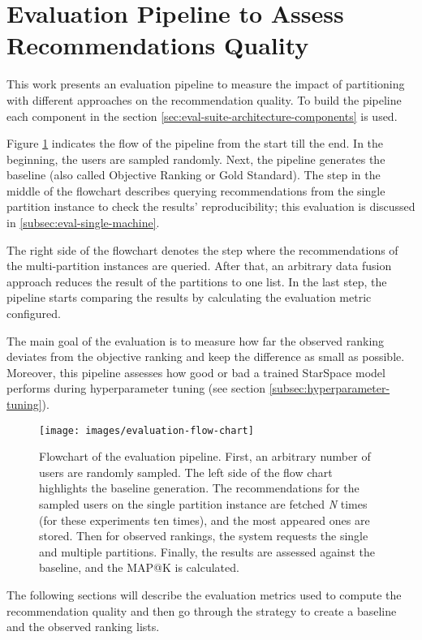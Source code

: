 \section{Evaluation Pipeline to Assess Recommendations Quality}
\label{sec:evaluation-pipeline}
This work presents an evaluation pipeline to measure the impact of partitioning with different approaches on the recommendation quality. To build the pipeline each component in the section \ref{sec:eval-suite-architecture-components} is used. 

Figure \ref{fig:flowchart-evaluation-pipeline} indicates the flow of the pipeline from the start till the end. In the beginning, the users are sampled randomly. Next, the pipeline generates the baseline (also called Objective Ranking or Gold Standard). The step in the middle of the flowchart describes querying recommendations from the single partition instance to check the results' reproducibility; this evaluation is discussed in \ref{subsec:eval-single-machine}. 


The right side of the flowchart denotes the step where the recommendations of the multi-partition instances are queried. After that, an arbitrary data fusion approach reduces the result of the partitions to one list. In the last step, the pipeline starts comparing the results by calculating the evaluation metric configured. 

The main goal of the evaluation is to measure how far the observed ranking deviates from the objective ranking and keep the difference as small as possible. Moreover, this pipeline assesses how good or bad a trained StarSpace model performs during hyperparameter tuning (see section \ref{subsec:hyperparameter-tuning}).

\begin{figure}[!htb]
    \centering
    \texttt{[image: images/evaluation-flow-chart]}
    \caption{Flowchart of the evaluation pipeline. First, an arbitrary number of users are randomly sampled. The left side of the flow chart highlights the baseline generation. The recommendations for the sampled users on the single partition instance are fetched \emph{N} times (for these experiments ten times), and the most appeared ones are stored. Then for observed rankings, the system requests the single and multiple partitions. Finally, the results are assessed against the baseline, and the MAP@K is calculated.}
    \label{fig:flowchart-evaluation-pipeline}
\end{figure}

The following sections will describe the evaluation metrics used to compute the recommendation quality and then go through the strategy to create a baseline and the observed ranking lists.

